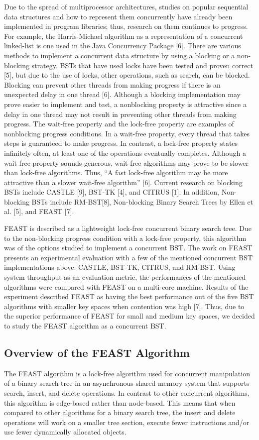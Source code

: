 \documentclass[conference]{IEEEtran}
\begin{document}
Due to the spread of multiprocessor architectures, studies on popular sequential data structures and how to represent them concurrently have already been implemented in program libraries; thus, research on them continues to progress. For example, the Harris-Michael algorithm as a representation of a concurrent linked-list is one used in the Java Concurrency Package [6]. There are various methods to implement a concurrent data structure by using a blocking or a non-blocking strategy. BSTs that have used locks have been tested and proven correct [5], but due to the use of locks, other operations, such as search, can be blocked. Blocking can prevent other threads from making progress if there is an unexpected delay in one thread [6]. Although a blocking implementation may prove easier to implement and test, a nonblocking property is attractive since a delay in one thread may not result in preventing other threads from making progress. The wait-free property and the lock-free property are examples of nonblocking progress conditions. In a wait-free property, every thread that takes steps is guaranteed to make progress. In contrast, a lock-free property states infinitely often, at least one of the operations eventually completes. Although a wait-free property sounds generous, wait-free algorithms may prove to be slower than lock-free algorithms. Thus, “A fast lock-free algorithm may be more attractive than a slower wait-free algorithm” [6]. Current research on blocking BSTs include CASTLE [9], BST-TK [4], and CITRUS [1]. In addition, Non-blocking BSTs include RM-BST[8], Non-blocking Binary Search Trees by Ellen et al. [5], and FEAST [7]. 

FEAST is described as a lightweight lock-free concurrent binary search tree. Due to the non-blocking progress condition with a lock-free property, this algorithm was of the options studied to implement a concurrent BST. The work on FEAST presents an experimental evaluation with a few of the mentioned concurrent BST implementations above: CASTLE, BST-TK, CITRUS, and RM-BST. Using system throughput as an evaluation metric, the performances of the mentioned algorithms were compared with FEAST on a multi-core machine. Results of the experiment described FEAST as having the best performance out of the five BST algorithms with smaller key spaces when contention was high [7]. Thus, due to the superior performance of FEAST for small and medium key spaces, we decided to study the FEAST algorithm as a concurrent BST.

\subsection{Overview of the FEAST Algorithm}
The FEAST algorithm is a lock-free algorithm used for concurrent manipulation of a binary search tree in an asynchronous shared memory system that supports search, insert, and delete operations. In contrast to other concurrent algorithms, this algorithm is edge-based rather than node-based. This means that when compared to other algorithms for a binary search tree, the insert and delete operations will work on a smaller tree section, execute fewer instructions and/or use fewer dynamically allocated objects. 
\end{document}
